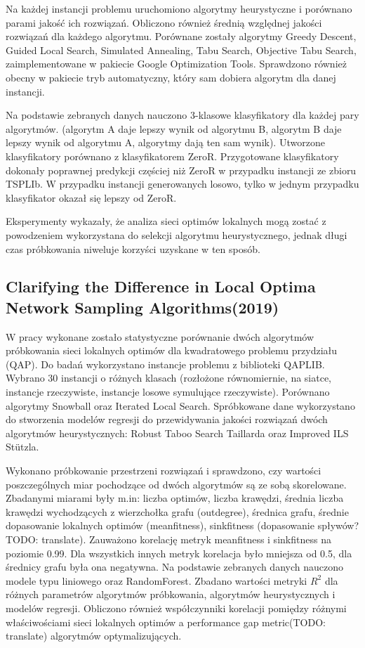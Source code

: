 Na każdej instancji problemu uruchomiono algorytmy heurystyczne i porównano parami jakość ich rozwiązań.
Obliczono również średnią względnej jakości rozwiązań dla każdego algorytmu.
Porównane zostały algorytmy Greedy Descent, Guided Local Search, Simulated Annealing, Tabu Search, Objective Tabu Search,
zaimplementowane w pakiecie Google Optimization Tools. Sprawdzono również obecny w pakiecie tryb automatyczny, który sam dobiera
algorytm dla danej instancji.

Na podstawie zebranych danych nauczono 3-klasowe klasyfikatory dla każdej pary algorytmów.
(algorytm A daje lepszy wynik od algorytmu B, algorytm B daje lepszy wynik od algorytmu A, algorytmy dają ten sam wynik).
Utworzone klasyfikatory porównano z klasyfikatorem ZeroR.
Przygotowane klasyfikatory dokonały poprawnej predykcji częściej niż ZeroR w przypadku instancji ze
zbioru TSPLIb. W przypadku instancji generowanych losowo, tylko w jednym przypadku klasyfikator
okazał się lepszy od ZeroR.

Eksperymenty wykazały, że analiza sieci optimów lokalnych mogą zostać z powodzeniem wykorzystana do
selekcji algorytmu heurystycznego, jednak długi czas próbkowania niweluje korzyści uzyskane w ten sposób.

\subsection*{Clarifying the Difference in Local Optima Network Sampling Algorithms(2019)\cite{DBLP:conf/evoW/ThomsonOV19}}
W pracy wykonane zostało statystyczne porównanie dwóch algorytmów próbkowania
sieci lokalnych optimów dla kwadratowego problemu przydziału (QAP).
Do badań wykorzystano instancje problemu z biblioteki QAPLIB.
Wybrano 30 instancji o różnych klasach (rozłożone równomiernie, na siatce,
instancje rzeczywiste, instancje losowe symulujące rzeczywiste).
Porównano algorytmy Snowball oraz Iterated Local Search.
Spróbkowane dane wykorzystano do stworzenia modelów regresji do przewidywania jakości rozwiązań
dwóch algorytmów heurystycznych: Robust Taboo Search Taillarda oraz Improved ILS Stützla.

Wykonano próbkowanie przestrzeni rozwiązań i sprawdzono, czy wartości poszczególnych miar pochodzące od dwóch algorytmów
są ze sobą skorelowane.
Zbadanymi miarami były m.in: liczba optimów, liczba krawędzi, średnia liczba krawędzi wychodzących z wierzchołka grafu (outdegree),
średnica grafu, średnie dopasowanie lokalnych optimów (meanfitness), sinkfitness (dopasowanie spływów? TODO: translate).
Zauważono korelację metryk meanfitness i sinkfitness  na poziomie 0.99.
Dla wszystkich innych metryk korelacja było mniejsza od 0.5, dla średnicy grafu była ona negatywna.
Na podstawie zebranych danych nauczono modele typu liniowego oraz RandomForest.
Zbadano wartości metryki $R^{2}$ dla różnych parametrów algorytmów próbkowania, algorytmów heurystycznych
i modelów regresji.
Obliczono również współczynniki korelacji pomiędzy różnymi właściwościami sieci lokalnych optimów
a performance gap metric(TODO: translate) algorytmów optymalizujących.

